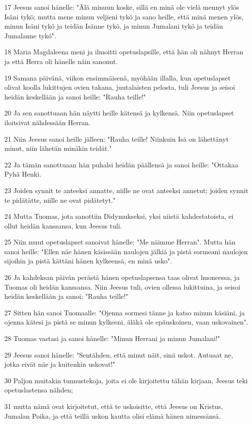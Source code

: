 \par 17 Jeesus sanoi hänelle: "Älä minuun koske, sillä en minä ole vielä mennyt ylös Isäni tykö; mutta mene minun veljieni tykö ja sano heille, että minä menen ylös, minun Isäni tykö ja teidän Isänne tykö, ja minun Jumalani tykö ja teidän Jumalanne tykö".
\par 18 Maria Magdaleena meni ja ilmoitti opetuslapsille, että hän oli nähnyt Herran ja että Herra oli hänelle näin sanonut.
\par 19 Samana päivänä, viikon ensimmäisenä, myöhään illalla, kun opetuslapset olivat koolla lukittujen ovien takana, juutalaisten pelosta, tuli Jeesus ja seisoi heidän keskellään ja sanoi heille: "Rauha teille!"
\par 20 Ja sen sanottuaan hän näytti heille kätensä ja kylkensä. Niin opetuslapset iloitsivat nähdessään Herran.
\par 21 Niin Jeesus sanoi heille jälleen: "Rauha teille! Niinkuin Isä on lähettänyt minut, niin lähetän minäkin teidät."
\par 22 Ja tämän sanottuaan hän puhalsi heidän päällensä ja sanoi heille: "Ottakaa Pyhä Henki.
\par 23 Joiden synnit te anteeksi annatte, niille ne ovat anteeksi annetut; joiden synnit te pidätätte, niille ne ovat pidätetyt."
\par 24 Mutta Tuomas, jota sanottiin Didymukseksi, yksi niistä kahdestatoista, ei ollut heidän kanssansa, kun Jeesus tuli.
\par 25 Niin muut opetuslapset sanoivat hänelle: "Me näimme Herran". Mutta hän sanoi heille: "Ellen näe hänen käsissään naulojen jälkiä ja pistä sormeani naulojen sijoihin ja pistä kättäni hänen kylkeensä, en minä usko".
\par 26 Ja kahdeksan päivän perästä hänen opetuslapsensa taas olivat huoneessa, ja Tuomas oli heidän kanssansa. Niin Jeesus tuli, ovien ollessa lukittuina, ja seisoi heidän keskellään ja sanoi: "Rauha teille!"
\par 27 Sitten hän sanoi Tuomaalle: "Ojenna sormesi tänne ja katso minun käsiäni, ja ojenna kätesi ja pistä se minun kylkeeni, äläkä ole epäuskoinen, vaan uskovainen".
\par 28 Tuomas vastasi ja sanoi hänelle: "Minun Herrani ja minun Jumalani!"
\par 29 Jeesus sanoi hänelle: "Sentähden, että minut näit, sinä uskot. Autuaat ne, jotka eivät näe ja kuitenkin uskovat!"
\par 30 Paljon muitakin tunnustekoja, joita ei ole kirjoitettu tähän kirjaan, Jeesus teki opetuslastensa nähden;
\par 31 mutta nämä ovat kirjoitetut, että te uskoisitte, että Jeesus on Kristus, Jumalan Poika, ja että teillä uskon kautta olisi elämä hänen nimessänsä.

